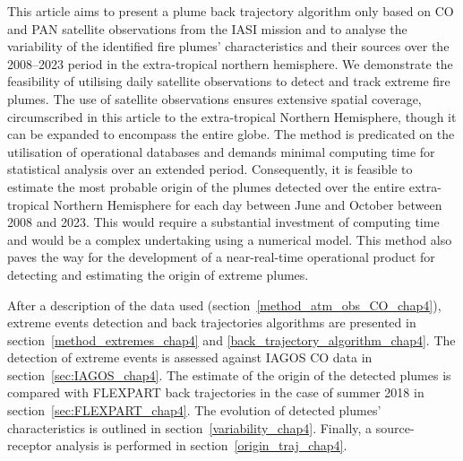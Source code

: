 \documentclass[acp, manuscript]{copernicus}
\begin{document}

This article aims to present a plume back trajectory algorithm only based on CO and PAN satellite observations from the IASI mission and to analyse the variability of the identified fire plumes' characteristics and their sources over the 2008--2023 period in the extra-tropical northern hemisphere. 
We demonstrate the feasibility of utilising daily satellite observations to detect and track extreme fire plumes. The use of satellite observations ensures extensive spatial coverage, circumscribed in this article to the extra-tropical Northern Hemisphere, though it can be expanded to encompass the entire globe. The method is predicated on the utilisation of operational databases and demands minimal computing time for statistical analysis over an extended period. Consequently, it is feasible to estimate the most probable origin of the plumes detected over the entire extra-tropical Northern Hemisphere for each day between June and October between 2008 and 2023. This would require a substantial investment of computing time and would be a complex undertaking using a numerical model.
This method also paves the way for the development of a near-real-time operational product for detecting and estimating the origin of extreme plumes.


After a description of the data used (section~\ref{method_atm_obs_CO_chap4}), extreme events detection and back trajectories algorithms are presented in section~\ref{method_extremes_chap4} and \ref{back_trajectory_algorithm_chap4}. The detection of extreme events is assessed against IAGOS CO data in section~\ref{sec:IAGOS_chap4}. The estimate of the origin of the detected plumes is compared with FLEXPART back trajectories in the case of summer 2018 in section~\ref{sec:FLEXPART_chap4}. The evolution of detected plumes' characteristics is outlined in section~\ref{variability_chap4}. Finally, a source-receptor analysis is performed in section~\ref{origin_traj_chap4}.



\end{document}
